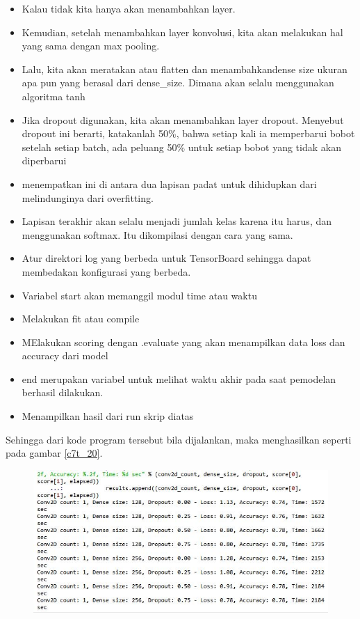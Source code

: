 \begin{enumerate}
\begin{itemize}
\item Kalau tidak kita hanya akan menambahkan layer.
\item Kemudian, setelah menambahkan layer konvolusi, kita akan melakukan hal yang sama dengan max pooling.
\item  Lalu, kita akan meratakan atau flatten dan menambahkandense size ukuran apa pun yang berasal dari dense\_size. Dimana akan selalu menggunakan algoritma tanh
\item Jika dropout digunakan, kita akan menambahkan layer dropout. Menyebut dropout ini berarti, katakanlah 50\%, bahwa setiap kali ia memperbarui bobot setelah setiap batch, ada peluang 50\% untuk setiap bobot yang tidak akan diperbarui
\item menempatkan ini di antara dua lapisan padat untuk dihidupkan dari melindunginya dari overfitting.
\item  Lapisan terakhir akan selalu menjadi jumlah kelas karena itu harus, dan menggunakan softmax. Itu dikompilasi dengan cara yang sama.
\item Atur direktori log yang berbeda untuk TensorBoard sehingga dapat membedakan konfigurasi yang berbeda.
\item Variabel start akan memanggil modul time atau waktu
\item Melakukan fit atau compile 
\item MElakukan scoring dengan .evaluate yang akan menampilkan data loss dan accuracy dari model
\item end merupakan variabel untuk melihat waktu akhir pada saat pemodelan berhasil dilakukan.
\item Menampilkan hasil dari run skrip diatas
\end{itemize}
\par Sehingga dari kode program tersebut bila dijalankan, maka menghasilkan seperti pada gambar \ref{c7t_20}.
\begin{figure}[!htbp]
\centerline{\includegraphics[width=1\textwidth]{figures/c7t/20.JPG}}

\end{figure}
\end{enumerate}
